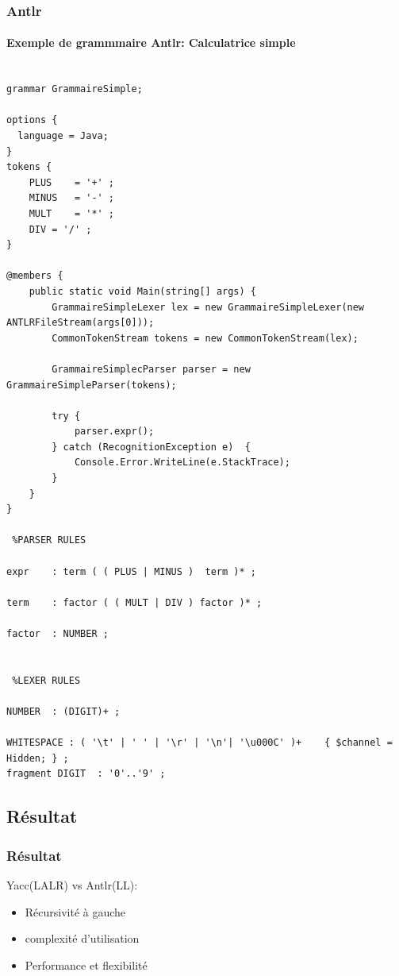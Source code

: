 \documentclass{beamer}
\begin{document}
\begin{frame}[fragile,allowframebreaks=0.98]\frametitle{Antlr}\framesubtitle{Exemple de grammmaire Antlr: Calculatrice simple}

\begin{verbatim}

grammar GrammaireSimple;

options {
  language = Java;
}
tokens {
    PLUS    = '+' ;
    MINUS   = '-' ;
    MULT    = '*' ;
    DIV = '/' ;
}
 
@members {
    public static void Main(string[] args) {
        GrammaireSimpleLexer lex = new GrammaireSimpleLexer(new ANTLRFileStream(args[0]));
        CommonTokenStream tokens = new CommonTokenStream(lex);
 
        GrammaireSimplecParser parser = new GrammaireSimpleParser(tokens);
 
        try {
            parser.expr();
        } catch (RecognitionException e)  {
            Console.Error.WriteLine(e.StackTrace);
        }
    }
}
 
 %PARSER RULES
 
expr    : term ( ( PLUS | MINUS )  term )* ;
 
term    : factor ( ( MULT | DIV ) factor )* ;
 
factor  : NUMBER ;
 
 
 %LEXER RULES
 
NUMBER  : (DIGIT)+ ;
 
WHITESPACE : ( '\t' | ' ' | '\r' | '\n'| '\u000C' )+    { $channel = Hidden; } ; 
fragment DIGIT  : '0'..'9' ;

\end{verbatim}


\end{frame}



\subsection{Résultat}

\begin{frame}\frametitle{Résultat}

	Yacc(LALR) vs Antlr(LL):
	\begin{itemize}
				\item Récursivité à gauche\newline
				\item complexité d'utilisation\newline
				\item Performance et flexibilité\newline
	\end{itemize}

\end{frame}
\end{document}
